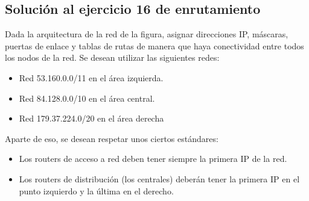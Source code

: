 \documentclass[letterpaper,10pt,spanish]{sphinxmanual}
\begin{document}
\subsection{Solución al ejercicio 16 de enrutamiento}
\label{\detokenize{t2_integracion_elementos/ejercicios_subredes_ipv4/ejercicios_dos_router:solucion-al-ejercicio-16-de-enrutamiento}}
\sphinxAtStartPar
Dada la arquitectura de la red de la figura, asignar direcciones IP, máscaras, puertas de enlace y tablas de rutas de manera que haya conectividad entre todos
los nodos de la red. Se desean utilizar las siguientes redes:
\begin{itemize}
\item {} 
\sphinxAtStartPar
Red 53.160.0.0/11 en el área izquierda.

\item {} 
\sphinxAtStartPar
Red 84.128.0.0/10 en el área central.

\item {} 
\sphinxAtStartPar
Red 179.37.224.0/20 en el área derecha

\end{itemize}

\begin{figure}[htbp]
\centering

\noindent{}
\end{figure}

\sphinxAtStartPar
Aparte de eso, se desean respetar unos ciertos estándares:
\begin{itemize}
\item {} 
\sphinxAtStartPar
Los routers de acceso a red deben tener siempre la primera IP de la red.

\item {} 
\sphinxAtStartPar
Los routers de distribución (los centrales) deberán tener la primera IP en el punto izquierdo y la última en el derecho.

\end{itemize}
\end{document}

